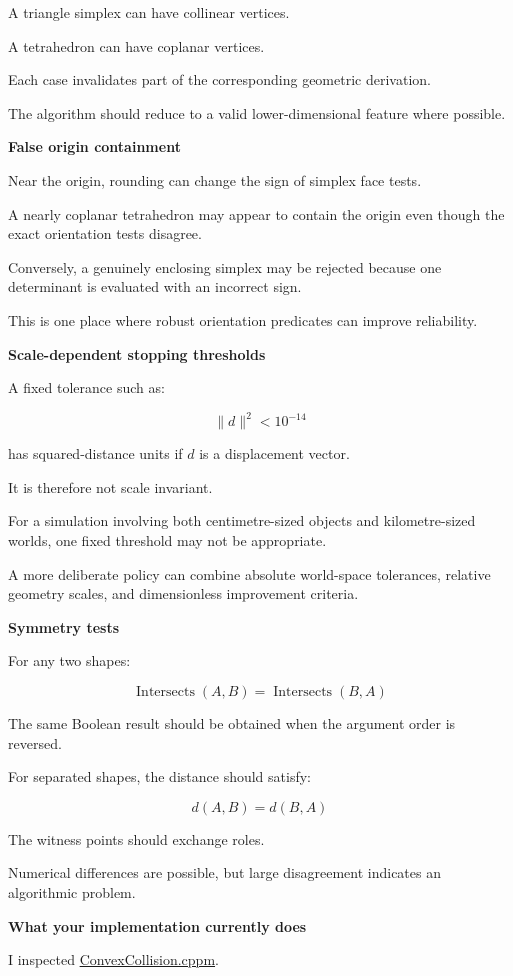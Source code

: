 A triangle simplex can have collinear vertices.

A tetrahedron can have coplanar vertices.

Each case invalidates part of the corresponding geometric derivation.

The algorithm should reduce to a valid lower-dimensional feature where possible.

\textbf{False origin containment}

Near the origin, rounding can change the sign of simplex face tests.

A nearly coplanar tetrahedron may appear to contain the origin even though the exact orientation tests disagree.

Conversely, a genuinely enclosing simplex may be rejected because one determinant is evaluated with an incorrect sign.

This is one place where robust orientation predicates can improve reliability.

\textbf{Scale-dependent stopping thresholds}

A fixed tolerance such as:

\[
\|d\|^2<10^{-14}
\]

has squared-distance units if \(d\) is a displacement vector.

It is therefore not scale invariant.

For a simulation involving both centimetre-sized objects and kilometre-sized worlds, one fixed threshold may not be appropriate.

A more deliberate policy can combine absolute world-space tolerances, relative geometry scales, and dimensionless improvement criteria.

\textbf{Symmetry tests}

For any two shapes:

\[
\operatorname{Intersects}(A,B) = \operatorname{Intersects}(B,A)
\]

The same Boolean result should be obtained when the argument order is reversed.

For separated shapes, the distance should satisfy:

\[
d(A,B)=d(B,A)
\]

The witness points should exchange roles.

Numerical differences are possible, but large disagreement indicates an algorithmic problem.

\textbf{What your implementation currently does}

I inspected \href{https://github.com/swayam8624/KairoPhysicsEngine/blob/main/ConvexCollision.cppm?utm_source=chatgpt.com}{ConvexCollision.cppm}.

